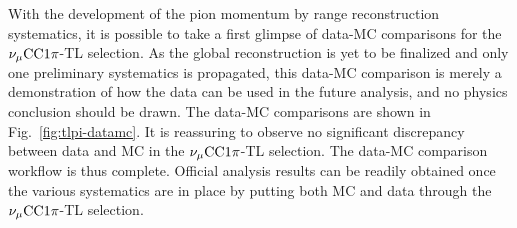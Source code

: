           With the development of the pion momentum by range reconstruction systematics, it is possible to take a first glimpse of data-MC comparisons for the $\nu_{\mu}\textrm{CC}1\pi$-TL selection. 
          As the global reconstruction is yet to be finalized and only one preliminary systematics is propagated, this data-MC comparison is merely a demonstration of how the data can be used in the future analysis, and no physics conclusion should be drawn.
          The data-MC comparisons are shown in Fig.~\ref{fig:tlpi-datamc}.
          It is reassuring to observe no significant discrepancy between data and MC in the $\nu_{\mu}\textrm{CC}1\pi$-TL selection.
          The data-MC comparison workflow is thus complete.
          Official analysis results can be readily obtained once the various systematics are in place by putting both MC and data through the $\nu_{\mu}\textrm{CC}1\pi$-TL selection.
